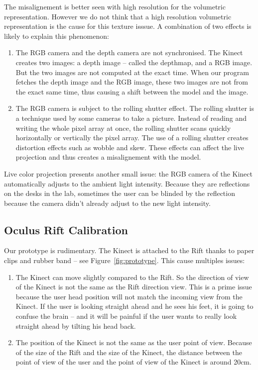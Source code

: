 \documentclass[12pt]{article}
\begin{document}
The misalignement is better seen with high resolution for the volumetric representation. However we do not think that a high resolution volumetric representation is the cause for this texture isssue. A combination of two effects is likely to explain this phenomenon:
\begin{enumerate}
\item The RGB camera and the depth camera are not synchronised. The Kinect creates two images: a depth image -- called the depthmap, and a RGB image. But the two images are not computed at the exact time. When our program fetches the depth image and the RGB image, these two images are not from the exact same time, thus causing a shift between the model and the image.
\item The RGB camera is subject to the rolling shutter effect. The rolling shutter is a technique used by some cameras to take a picture. Instead of reading and writing the whole pixel array at once, the rolling shutter scans quickly horizontally or vertically the pixel array. The use of a rolling shutter creates distortion effects such as wobble and skew. These effects can affect the live projection and thus creates a misalignement with the model.
\end{enumerate}

Live color projection presents another small issue: the RGB camera of the Kinect automatically adjusts to the ambient light intensity. Because they are reflections on the desks in the lab, sometimes the user can be blinded by the reflection because the camera didn't already adjust to the new light intensity.

\subsection{Oculus Rift Calibration}

Our prototype is rudimentary. The Kinect is attached to the Rift thanks to paper clips and rubber band -- see Figure~\ref{fig:prototype}. This cause multiples issues:
\begin{enumerate}
\item The Kinect can move slightly compared to the Rift. So the direction of view of the Kinect is not the same as the Rift direction view. This is a prime issue because the user head position will not match the incoming view from the Kinect. If the user is looking straight ahead and he sees his feet, it is going to confuse the brain -- and it will be painful if the user wants to really look straight ahead by tilting his head back.
\item The position of the Kinect is not the same as the user point of view. Because of the size of the Rift and the size of the Kinect, the distance between the point of view of the user and the point of view of the Kinect is around 20cm.
\end{enumerate}
\end{document}
